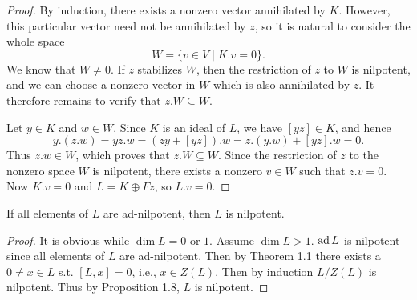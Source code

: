 \begin{proof}
    By induction, there exists a nonzero vector annihilated by $K$. However, this particular vector need not be annihilated by $z$, so it is natural to consider the whole space
    \[
        W=\{v\in V\mid K.v=0\}.
    \]
    We know that $W\neq 0$. If $z$ stabilizes $W$, then the restriction of $z$ to $W$ is nilpotent, and we can choose a nonzero vector in $W$ which is also annihilated by $z$. It therefore remains to verify that $z.W\subseteq W$.

    Let $y\in K$ and $w\in W$. Since $K$ is an ideal of $L$, we have $[yz]\in K$, and hence
    \[
        y.(z.w)=yz.w=(zy+[yz]).w=z.(y.w)+[yz].w=0.
    \]
    Thus $z.w\in W$, which proves that $z.W\subseteq W$. Since the restriction of $z$ to the nonzero space $W$ is nilpotent, there exists a nonzero $v\in W$ such that $z.v=0$. Now $K.v=0$ and $L=K\oplus Fz$, so $L.v=0$.
\end{proof}

\begin{theorem}[Engel]
    If all elements of $L$ are ad-nilpotent, then $L$ is nilpotent.
\end{theorem}
\begin{proof}
    It is obvious while $\operatorname{dim}L=0\text{ or } 1$. Assume $\operatorname{dim}L>1$. $\operatorname{ad} L$ is nilpotent since all elements of $L$ are ad-nilpotent. Then by Theorem 1.1 there exists a $0\neq x\in L$ s.t. $[L,x]=0$, i.e., $x \in Z(L)$. Then by induction $L/Z(L)$ is nilpotent. Thus by Proposition 1.8, $L$ is nilpotent.
\end{proof}










































